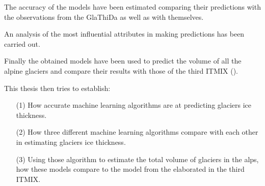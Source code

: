 The accuracy of the models have been estimated comparing their predictions with the observations from the GlaThiDa as well as with themselves.

An analysis of the most influential attributes in making predictions has been carried out.

Finally the obtained models have been used to predict the volume of all the alpine glaciers and compare their results with those of the third ITMIX (\citet{Farinotti2019}).


This thesis then tries to establish:
\begin{itemize}
\item[(1)] How accurate machine learning algorithms are at predicting glaciers ice thickness.
\item[(2)] How three different machine learning algorithms compare with each other in estimating glaciers ice thickness.
\item[(3)] Using those algorithm to estimate the total volume of glaciers in the alps, how these models compare to the model from the \cite{Farinotti2019} elaborated in the third ITMIX.
\end{itemize}

%
%
